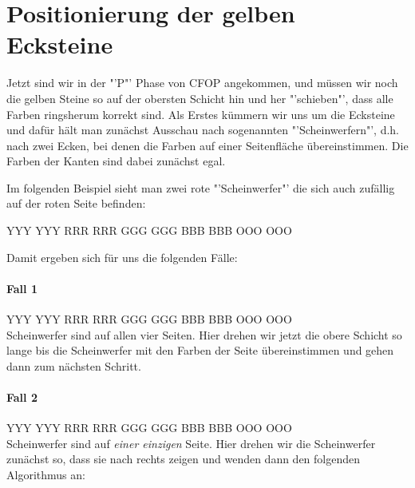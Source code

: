 \section{Positionierung der gelben Ecksteine}
Jetzt sind wir in der "'P"' Phase von CFOP angekommen, und müssen wir noch die gelben Steine so auf der obersten Schicht hin und
her "'schieben"', dass alle Farben ringsherum korrekt sind.
Als Erstes kümmern wir uns um die Ecksteine und dafür hält man zunächst
Ausschau nach sogenannten "'Scheinwerfern"', d.h. nach zwei Ecken,
bei denen die Farben auf einer Seitenfläche übereinstimmen. Die Farben der
Kanten sind dabei zunächst egal.

Im folgenden Beispiel sieht man zwei rote "'Scheinwerfer"' die sich auch
zufällig auf der roten Seite befinden:

\begin{center}
  \RubikCubeGreyAll%
	      {Y}{Y}{Y}
	      {Y}{Y}{Y}%
		 {R}{R}{R}
		 {R}{R}{R}%
		 {G}{G}{G}
		 {G}{G}{G}%
		{B}{B}{B}
		{B}{B}{B}%
		{O}{O}{O}
		{O}{O}{O}%
\end{center}

Damit ergeben sich für uns die folgenden Fälle:

\paragraph{Fall 1}
\RubikCubeGreyAll%
            {Y}{Y}{Y}
            {Y}{Y}{Y}%
               {R}{R}{R}
	       {R}{R}{R}%
	       {G}{G}{G}
	       {G}{G}{G}%
	      {B}{B}{B}
	      {B}{B}{B}%
	      {O}{O}{O}
	      {O}{O}{O}%
\\[1em]
Scheinwerfer sind auf allen vier Seiten. Hier drehen wir jetzt die obere
Schicht so lange bis die Scheinwerfer mit den Farben der Seite übereinstimmen
und gehen dann zum nächsten Schritt.

\paragraph{Fall 2}
\RubikCubeGreyAll%
            {Y}{Y}{Y}
            {Y}{Y}{Y}%
               {R}{R}{R}
	       {R}{R}{R}%
	       {G}{G}{G}
	       {G}{G}{G}%
	      {B}{B}{B}
	      {B}{B}{B}%
	      {O}{O}{O}
	      {O}{O}{O}%
\\[1em]
Scheinwerfer sind auf \emph{einer einzigen} Seite. Hier drehen wir die
Scheinwerfer zunächst so, dass sie nach rechts zeigen und wenden dann den
folgenden Algorithmus an:
\begin{center}
\end{center}

